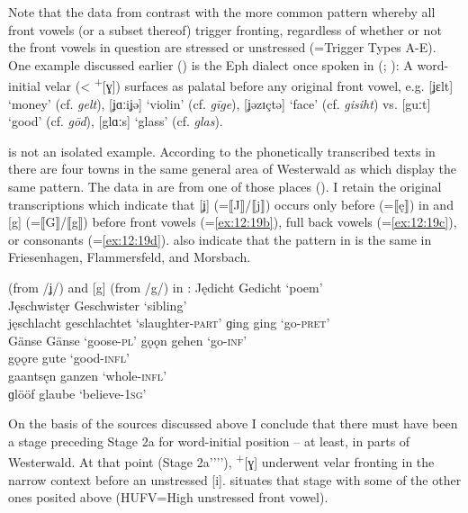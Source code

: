 Note that the data from  contrast with the more common pattern whereby all front vowels (or a subset thereof) trigger fronting, regardless of whether or not the front vowels in question are stressed or unstressed (=Trigger Types A-E). One example discussed earlier () is the Eph dialect once spoken in  (\citealt{Hille1939}; ): A word-initial velar (< \textsuperscript{+}[ɣ]) surfaces as palatal before any original front vowel, e.g. [ʝɛlt] ‘money’ (cf.  \textit{gelt}), [ʝɑːiʝǝ] ‘violin’ (cf.  \textit{gīge}), [ʝǝzɪçtǝ] ‘face’ (cf.  \textit{gisiht}) vs. [guːt] ‘good’ (cf.  \textit{gōd}), [glɑːs] ‘glass’ (cf.  \textit{glas}).

 is not an isolated example. According to the phonetically transcribed texts in \citet{CornelissenEtAl1989} there are four towns in the same general area of Westerwald as  which display the same pattern. The data in  are from one of those places (). I retain the original transcriptions which indicate that [ʝ] (=⟦J⟧/⟦j⟧) occurs only before  (=⟦ę⟧) in  and [g] (=⟦G⟧/⟦g⟧) before front vowels (=\ref{ex:12:19b}), full back vowels (=\ref{ex:12:19c}), or consonants (=\ref{ex:12:19d}). \citet{CornelissenEtAl1989} also indicate that the pattern in  is the same in Friesenhagen, Flammersfeld, and Morsbach.

\ea%
\label{ex:12:19}\relax[ʝ] (from /ʝ/) and [g] (from /g/) in :
\ea\label{ex:12:19a} Jędicht \tab Gedicht \tab ‘poem’\\
    Jęschwistęr \tab Geschwister \tab ‘sibling’\\
    jęschlacht \tab geschlachtet \tab ‘slaughter-\textsc{part}’
\ex\label{ex:12:19b} ɡing \tab ging \tab ‘go-\textsc{pret}’\\
    Gänse \tab Gänse \tab ‘goose-\textsc{pl}’
\ex\label{ex:12:19c} gǫǫn \tab gehen \tab ‘go-\textsc{inf}’\\
    gǫǫre \tab gute \tab ‘good-\textsc{infl}’\\
    gaantsęn \tab ganzen \tab ‘whole-\textsc{infl}’\\
\ex\label{ex:12:19d} ɡlööf \tab glaube \tab ‘believe-\textsc{1sg}’
\z 
\z 

On the basis of the sources discussed above I conclude that there must have been a stage preceding Stage 2a for word-initial position -- at least, in parts of Westerwald. At that point (Stage 2a{}'{}'{}'{}'),  \textsuperscript{+}[ɣ] underwent velar fronting in the narrow context before an unstressed [i].  situates that stage with some of the other ones posited above (HUFV=High unstressed front vowel).

